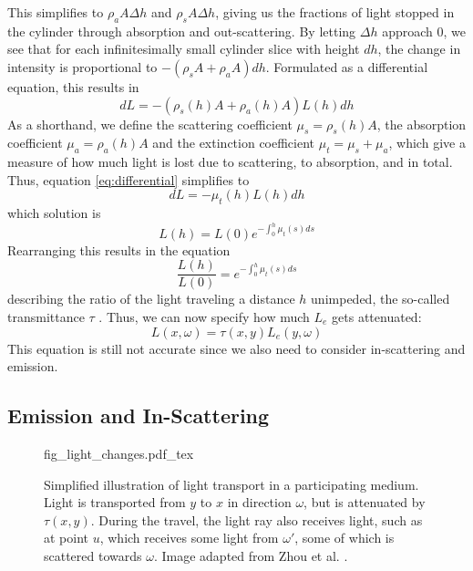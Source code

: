 This simplifies to ${\rho}_aA{\Delta}h$ and ${\rho}_sA{\Delta}h$, giving us the fractions of light stopped in the cylinder through absorption and out-scattering. By letting $\Delta h$ approach 0, we see that for each infinitesimally small cylinder slice with height $dh$, the change in intensity is proportional to $-({\rho}_sA + {\rho}_aA)dh$.
Formulated as a differential equation, this results in
\begin{equation} \label{eq:differential}
dL = -({\rho}_s(h)A + {\rho}_a(h)A)L(h)dh
\end{equation}
As a shorthand, we define the scattering coefficient ${\mu}_s ={\rho}_s(h)A $, the absorption coefficient ${\mu}_a = {\rho}_a(h)A$ and the extinction coefficient ${\mu}_t = {\mu}_s +{\mu}_a$, which give a measure of how much light is lost due to scattering, to absorption, and in total. Thus, equation \ref{eq:differential} simplifies to
\begin{equation}
dL = - {\mu}_t(h)L(h)dh
\end{equation}
which solution is
\begin{equation}
L(h) = L(0)e^{-\int_{0}^{h} {\mu}_t(s)ds}
\end{equation}
Rearranging this results in the equation
\begin{equation} \label{eq:tau_definition}
\frac{L(h)}{L(0)} = e^{-\int_{0}^{h} {\mu}_t(s)ds}
\end{equation}
describing the ratio of the light traveling a distance $h$ unimpeded, the so-called transmittance $\tau$ .
Thus, we can now specify how much $L_e$ gets attenuated:
\begin{equation}
L({x},\omega ) =\tau({x}, {y}) L_e({y}, \omega )
\end{equation}
This equation is still not accurate since we also need to consider in-scattering and emission.
\subsection{Emission and In-Scattering}


\begin{figure}
\centering
\def\svgwidth{\columnwidth}
{fig_light_changes.pdf_tex}

\caption{Simplified illustration of light transport in a participating medium. Light is transported from $y$ to $x$ in direction $\omega$, but is attenuated by $\tau(x,y)$. During the travel, the light ray also receives light, such as at point $u$, which receives some light from $\omega'$, some of which is scattered towards $\omega$. Image adapted from Zhou et al. \cite{zhou2007real-time}.}
\label{fig:light_changes}
\end{figure}


